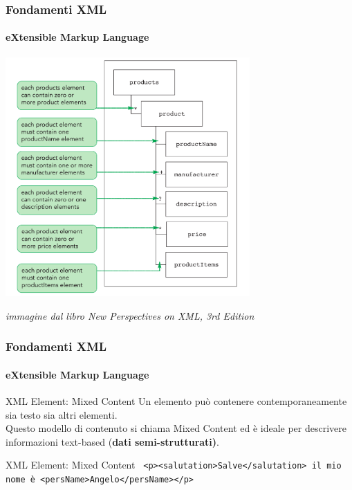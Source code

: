 \begin{frame}
	\frametitle{Fondamenti XML}
	\framesubtitle{eXtensible Markup Language}
	\addtocounter{nframe}{1}

	\begin{center}
		
		\includegraphics[width=0.7\textwidth]{imgs/xml-parent-child-quantifier2.png}
	\end{center}
\begin{tiny}\textit{immagine dal libro New Perspectives on XML, 3rd Edition}\end{tiny}
\end{frame}


\begin{frame}
    \frametitle{Fondamenti XML}
    \framesubtitle{eXtensible Markup Language}
    \addtocounter{nframe}{1}

	\begin{block}{XML Element: Mixed Content}
		Un elemento può contenere contemporaneamente sia testo sia altri elementi. 
		\\Questo modello di contenuto si chiama Mixed Content ed è ideale per descrivere informazioni text-based (\textbf{dati semi-strutturati)}.
	\end{block}

	\begin{block}{XML Element: Mixed Content}
		\texttt{
			<p><salutation>Salve</salutation> il mio nome è <persName>Angelo</persName></p>
			} 
	\end{block}


\end{frame}

